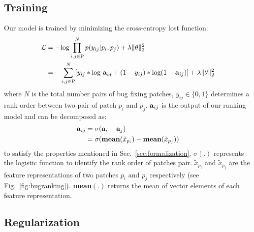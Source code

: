 \subsection{Training}
\label{sec:trainingmodel}
Our model is trained by minimizing the cross-entropy lost function: 
\begin{equation}
\begin{split}
	\mathcal{L} &= -\text{log}\prod^N_{i,j  \in \text{P}}p(y_{ij}|p_i,p_j) + \lambda \lVert \theta \lVert^2_2 \\ &= -\sum_{i, j \in \text{P}}^{N} [y_{ij} * \text{log \textbf{a}}_{ij} + (1 - y_{ij}) * \text{log}(1 - \text{\textbf{a}}_{ij})] + \lambda \lVert \theta \lVert^2_2
\end{split}
\end{equation}
where $N$ is the total number pairs of bug fixing patches, $y_{ij} \in \{0, 1\}$ determines a rank order between two pair of patch $p_i$ and $p_j$. $\text{\textbf{a}}_{ij}$ is the output of our ranking model and can be decomposed as:
\begin{equation}
\begin{split}
\text{\textbf{a}}_{ij} & = \sigma(\text{\textbf{a}}_i - \text{\textbf{a}}_{j}) \\
& = \sigma (\text{\textbf{mean}}(\tilde{x}_{p_i}) - \text{\textbf{mean}}(\tilde{x}_{p_j}))
\end{split}
\end{equation}
to satisfy the properties mentioned in Sec.~\ref{sec:formalization}. $\sigma(.)$ represents the logistic function to identify the rank order of patches pair. $\tilde{x}_{p_i}$ and $\tilde{x}_{p_j}$ are the feature representations of two patches $p_i$ and $p_j$ respectively (see Fig.~\ref{fig:bugranking}). \textbf{mean}$(.)$ returns the mean of vector elements of each feature representation. 

\subsection{Regularization}
\label{sec:regularization}



